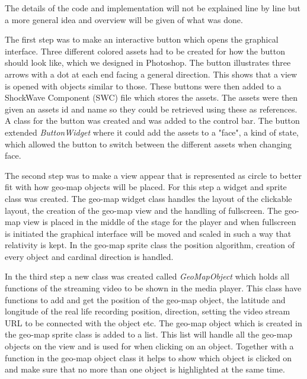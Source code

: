 The details of the code and implementation will not be explained line by line but a more general idea and overview will be given of what was done.

The first step was to make an interactive button which opens the graphical interface. Three different colored assets had to be created for how the button should look like, which we designed in Photoshop. The button illustrates three arrows with a dot at each end facing a general direction. This shows that a view is opened with objects similar to those. These buttons were then added to a ShockWave Component (SWC) file which stores the assets. The assets were then given an assets id and name so they could be retrieved using these as references. A class for the button was created and was added to the control bar. The button extended \textit{ButtonWidget} where it could add the assets to a "face", a kind of state, which allowed the button to switch between the different assets when changing face. 

The second step was to make a view appear that is represented as circle to better fit with how geo-map objects will be placed. For this step a widget and sprite class was created. The geo-map widget class handles the layout of the clickable layout, the creation of the geo-map view and the handling of fullscreen. The geo-map view is placed in the middle of the stage for the player and when fullscreen is initiated the graphical interface will be moved and scaled in such a way that relativity is kept. In the geo-map sprite class the position algorithm, creation of every object and cardinal direction is handled.

In the third step a new class was created called \textit{GeoMapObject} which holds all functions of the streaming video to be shown in the media player. This class have functions to add and get the position of the geo-map object, the latitude and longitude of the real life recording position, direction, setting the video stream URL to be connected with the object etc. The geo-map object which is created in the geo-map sprite class is added to a list. This list will handle all the geo-map objects on the view and is used for when clicking on an object. Together with a function in the geo-map object class it helps to show which object is clicked on and make sure that no more than one object is highlighted at the same time.

